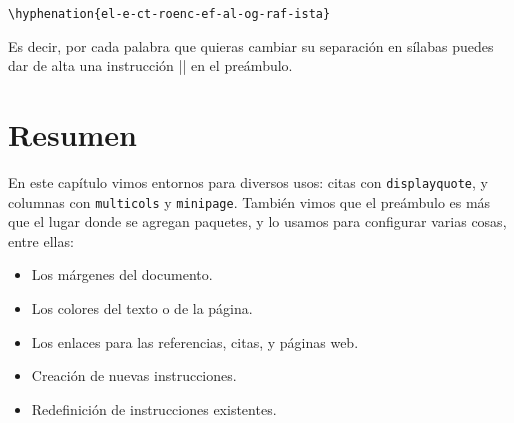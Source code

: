 \begin{lstlisting}[style=latex]
\hyphenation{el-e-ct-roenc-ef-al-og-raf-ista}
\end{lstlisting}

Es decir, por cada palabra que quieras cambiar su separación en sílabas puedes dar de alta una instrucción |\hyphenation| en el preámbulo.



\section*{Resumen}



En este capítulo vimos entornos para diversos usos: citas con \texttt{displayquote}, y columnas con \texttt{multicols} y \texttt{minipage}. También vimos que el preámbulo es más que el lugar donde se agregan paquetes, y lo usamos para configurar varias cosas, entre ellas:
\begin{itemize}
	\item Los márgenes del documento.
	\item Los colores del texto o de la página.
	\item Los enlaces para las referencias, citas, y páginas web.
	\item Creación de nuevas instrucciones.
	\item Redefinición de instrucciones existentes.
\end{itemize}